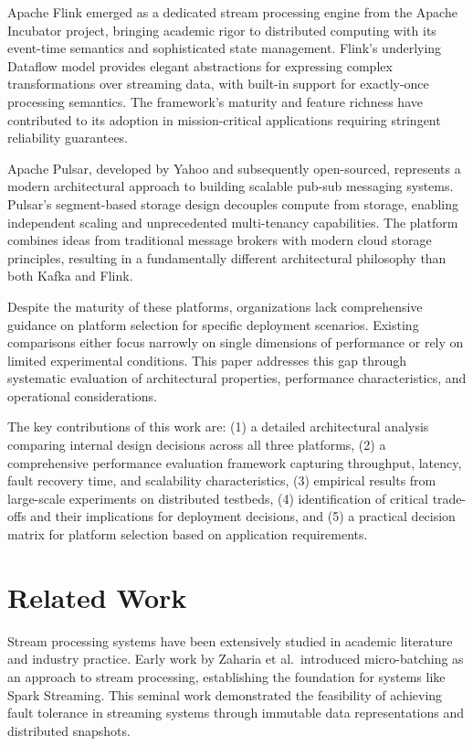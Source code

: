 \documentclass[10pt,twocolumn]{article}
\begin{document}
Apache Flink emerged as a dedicated stream processing engine from the Apache Incubator project, bringing academic rigor to distributed computing with its event-time semantics and sophisticated state management. Flink's underlying Dataflow model provides elegant abstractions for expressing complex transformations over streaming data, with built-in support for exactly-once processing semantics. The framework's maturity and feature richness have contributed to its adoption in mission-critical applications requiring stringent reliability guarantees.

Apache Pulsar, developed by Yahoo and subsequently open-sourced, represents a modern architectural approach to building scalable pub-sub messaging systems. Pulsar's segment-based storage design decouples compute from storage, enabling independent scaling and unprecedented multi-tenancy capabilities. The platform combines ideas from traditional message brokers with modern cloud storage principles, resulting in a fundamentally different architectural philosophy than both Kafka and Flink.

Despite the maturity of these platforms, organizations lack comprehensive guidance on platform selection for specific deployment scenarios. Existing comparisons either focus narrowly on single dimensions of performance or rely on limited experimental conditions. This paper addresses this gap through systematic evaluation of architectural properties, performance characteristics, and operational considerations.

The key contributions of this work are: (1) a detailed architectural analysis comparing internal design decisions across all three platforms, (2) a comprehensive performance evaluation framework capturing throughput, latency, fault recovery time, and scalability characteristics, (3) empirical results from large-scale experiments on distributed testbeds, (4) identification of critical trade-offs and their implications for deployment decisions, and (5) a practical decision matrix for platform selection based on application requirements.

\section{Related Work}

Stream processing systems have been extensively studied in academic literature and industry practice. Early work by Zaharia et al.\ introduced micro-batching as an approach to stream processing, establishing the foundation for systems like Spark Streaming. This seminal work demonstrated the feasibility of achieving fault tolerance in streaming systems through immutable data representations and distributed snapshots.
\end{document}
